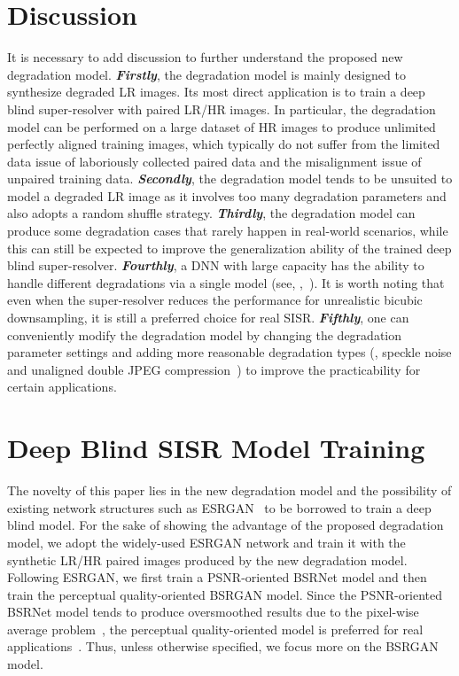 \documentclass[10pt,twocolumn,letterpaper]{article}
\begin{document}
\section{Discussion}
It is necessary to add discussion to further understand the proposed new degradation model.
\textbf{\emph{Firstly}}, the degradation model is mainly designed to synthesize degraded LR images.
Its most direct application is to train a deep blind super-resolver with paired LR/HR images.
In particular, the degradation model can be performed on a large dataset of HR images to produce unlimited perfectly aligned training images, which typically do not suffer from the limited data issue of laboriously collected paired data and the misalignment issue of unpaired training data.
\textbf{\emph{Secondly}}, the degradation model tends to be unsuited to model a degraded LR image as it involves too many degradation parameters and also adopts a random shuffle strategy.
\textbf{\emph{Thirdly}}, the degradation model can produce some degradation cases that rarely happen in real-world scenarios, while this can still be expected to improve the generalization ability of the trained deep blind super-resolver.
\textbf{\emph{Fourthly}}, a DNN with large capacity has the ability to handle different degradations via a single model (see, \eg,~\cite{zhang2017beyond}). It is worth noting that even when the super-resolver reduces the performance for unrealistic bicubic downsampling, it is still a preferred choice for real SISR.
\textbf{\emph{Fifthly}}, one can conveniently modify the degradation model by changing the degradation parameter settings and adding more reasonable degradation types (\eg,
speckle noise and unaligned double JPEG compression~\cite{jiang2021towards}) to improve the practicability for certain applications.




\section{Deep Blind SISR Model Training}\label{sec:experiments}

The novelty of this paper lies in the new degradation model and the possibility of existing network structures such as ESRGAN~\cite{wang2018esrgan} to be borrowed to train a deep blind model.
For the sake of showing the advantage of the proposed degradation model, we adopt the widely-used ESRGAN network and train it with the synthetic LR/HR paired images produced by the new degradation model.
Following ESRGAN, we first train a PSNR-oriented BSRNet model and then train the perceptual quality-oriented BSRGAN model.
Since the PSNR-oriented BSRNet model tends to produce oversmoothed results due to the pixel-wise average problem~\cite{ledig2016photo}, the perceptual quality-oriented model is preferred for real applications~\cite{blau2018perception}.
Thus, unless otherwise specified, we focus more on the BSRGAN model.
\end{document}
